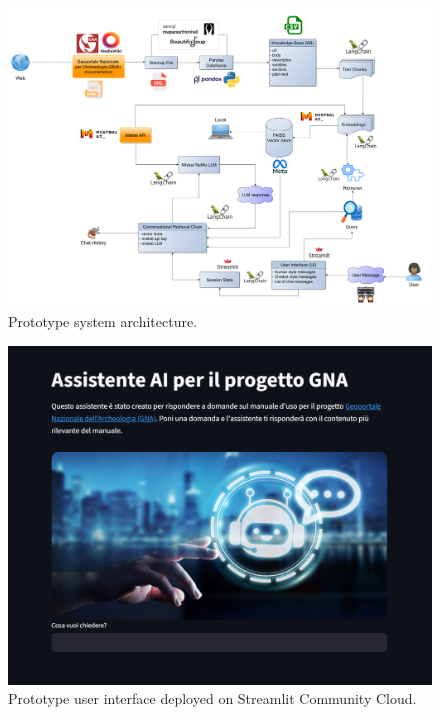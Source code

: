 \begin{spacing}{1.5}
\begin{figure}[H]
  \centering
  \includegraphics[width=\textwidth]{images/prototype_diagram.png} 
  \caption{Prototype system architecture.}
  \label{fig:protosys}
\end{figure}

\begin{figure}[H]
  \centering
  \includegraphics[width=\textwidth]{images/proto_UI.png} 
  \caption{Prototype user interface deployed on Streamlit Community Cloud.}
  \label{fig:proto_UI}
\end{figure}


\end{spacing}
